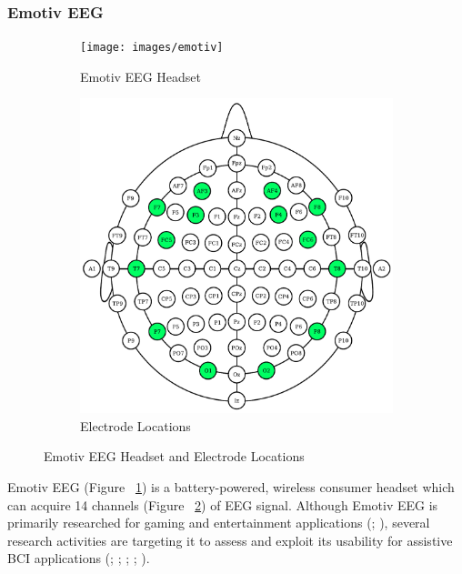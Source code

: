 \documentclass[12pt]{article}
\newcommand\mysubsubsection[1]{\subsubsection{#1}}
\numberwithin{equation}{section}
\numberwithin{figure}{section}
\numberwithin{table}{section}
\begin{document}
\mysubsubsection{Emotiv EEG}
\par{
    \begin{figure}
        \centering
        \begin{subfigure}{.45\textwidth}
            \vspace*{2.55cm}
            \texttt{[image: images/emotiv]}
            \caption{Emotiv EEG Headset}
            \label{fig:emotiv_eeg_headset}
        \end{subfigure}%
        \begin{subfigure}{.55\textwidth}
            \centering
            \includegraphics[scale=.4]{images/10_20_emotiv}
            \caption{Electrode Locations}
            \label{fig:emotiv_eeg_1020}
        \end{subfigure}
        \caption{Emotiv EEG Headset and Electrode Locations}
        \label{fig:emotiv_eeg_headset_locations}
    \end{figure}

    Emotiv EEG (Figure ~\ref{fig:emotiv_eeg_headset}) is a battery-powered, wireless consumer headset which can
    acquire 14 channels (Figure ~\ref{fig:emotiv_eeg_1020}) of EEG signal. Although Emotiv EEG is primarily
    researched for gaming and entertainment applications (\citealp{van_vliet_designing_2012}; \citealp{chumerin_steady-state_2013}),
    several research activities are targeting it to assess and exploit its usability for
    assistive BCI applications (\citealp{liu_implementation_2012}; \citealp{badcock_validation_2013}; \citealp{caglayan_humanoid_2013}; \citealp{guneysu_ssvep_2013}; \citealp{choi_low-cost_2013}).
}
\end{document}
